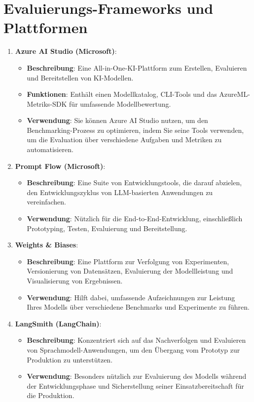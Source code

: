 \section{Evaluierungs-Frameworks und Plattformen} 
\begin{enumerate}
    \item \textbf{Azure AI Studio (Microsoft)}\cite{huang_evaluating_2024}: 
    \begin{itemize} 
        \item \textbf{Beschreibung}: Eine All-in-One-KI-Plattform zum Erstellen, Evaluieren und Bereitstellen von KI-Modellen. 
        \item \textbf{Funktionen}: Enthält einen Modellkatalog, CLI-Tools und das AzureML-Metriks-SDK für umfassende Modellbewertung.
         \item \textbf{Verwendung}: Sie können Azure AI Studio nutzen, um den Benchmarking-Prozess zu optimieren, indem Sie seine Tools verwenden, um die Evaluation über verschiedene Aufgaben und Metriken zu automatisieren.
    \end{itemize}
    
    \item \textbf{Prompt Flow (Microsoft)}\cite{huang_evaluating_2024}:
    \begin{itemize}
        \item \textbf{Beschreibung}: Eine Suite von Entwicklungstools, die darauf abzielen, den Entwicklungszyklus von LLM-basierten Anwendungen zu vereinfachen.
        \item \textbf{Verwendung}: Nützlich für die End-to-End-Entwicklung, einschließlich Prototyping, Testen, Evaluierung und Bereitstellung.
    \end{itemize}
    
    \item \textbf{Weights \& Biases}\cite{huang_evaluating_2024}:
    \begin{itemize}
        \item \textbf{Beschreibung}: Eine Plattform zur Verfolgung von Experimenten, Versionierung von Datensätzen, Evaluierung der Modellleistung und Visualisierung von Ergebnissen.
        \item \textbf{Verwendung}: Hilft dabei, umfassende Aufzeichnungen zur Leistung Ihres Modells über verschiedene Benchmarks und Experimente zu führen.
    \end{itemize}
    
    \item \textbf{LangSmith (LangChain)}\cite{huang_evaluating_2024}:
    \begin{itemize}
        \item \textbf{Beschreibung}: Konzentriert sich auf das Nachverfolgen und Evaluieren von Sprachmodell-Anwendungen, um den Übergang vom Prototyp zur Produktion zu unterstützen.
        \item \textbf{Verwendung}: Besonders nützlich zur Evaluierung des Modells während der Entwicklungsphase und Sicherstellung seiner Einsatzbereitschaft für die Produktion.
    \end{itemize}
    

\end{enumerate}
